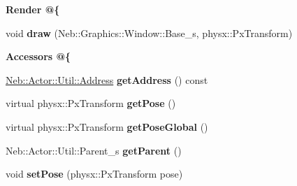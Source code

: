 \begin{Indent}{\bf Render @\{}\par
\begin{DoxyCompactItemize}
\item 
\hypertarget{classNeb_1_1Actor_1_1Base_aa7a1124c6d32fb41ecf26f2d7c2a486a}{void {\bfseries draw} (Neb\-::\-Graphics\-::\-Window\-::\-Base\-\_\-s, physx\-::\-Px\-Transform)}\label{classNeb_1_1Actor_1_1Base_aa7a1124c6d32fb41ecf26f2d7c2a486a}

\end{DoxyCompactItemize}
\end{Indent}
\begin{Indent}{\bf Accessors @\{}\par
\begin{DoxyCompactItemize}
\item 
\hypertarget{classNeb_1_1Actor_1_1Base_a3125fb49728707613266d4818df328cf}{\hyperlink{classNeb_1_1Actor_1_1Util_1_1Address}{Neb\-::\-Actor\-::\-Util\-::\-Address} {\bfseries get\-Address} () const }\label{classNeb_1_1Actor_1_1Base_a3125fb49728707613266d4818df328cf}

\item 
\hypertarget{classNeb_1_1Actor_1_1Base_aac89b4475a9443894c9814472702adcb}{virtual physx\-::\-Px\-Transform {\bfseries get\-Pose} ()}\label{classNeb_1_1Actor_1_1Base_aac89b4475a9443894c9814472702adcb}

\item 
\hypertarget{classNeb_1_1Actor_1_1Base_a76f34261b14ea648f42da355138efc9b}{virtual physx\-::\-Px\-Transform {\bfseries get\-Pose\-Global} ()}\label{classNeb_1_1Actor_1_1Base_a76f34261b14ea648f42da355138efc9b}

\item 
\hypertarget{classNeb_1_1Actor_1_1Base_a37766d7d2d3a32a90e4a81d039248588}{Neb\-::\-Actor\-::\-Util\-::\-Parent\-\_\-s {\bfseries get\-Parent} ()}\label{classNeb_1_1Actor_1_1Base_a37766d7d2d3a32a90e4a81d039248588}

\item 
\hypertarget{classNeb_1_1Actor_1_1Base_a98dd3ef316b4d28c5f36efa2d1e73966}{void {\bfseries set\-Pose} (physx\-::\-Px\-Transform pose)}\label{classNeb_1_1Actor_1_1Base_a98dd3ef316b4d28c5f36efa2d1e73966}

\end{DoxyCompactItemize}
\end{Indent}
